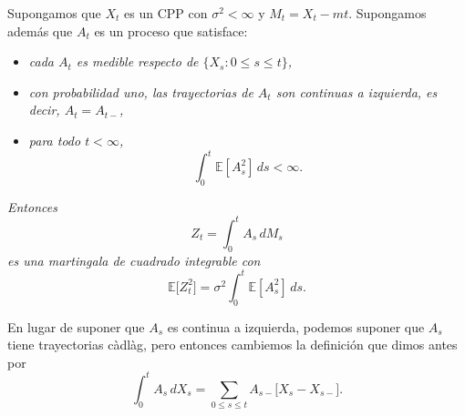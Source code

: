 \documentclass[
marginals=nomargin
]{kaohandt}
\begin{document}
	\begin{proposition}
		Supongamos que $X_t$ es un CPP con $\sigma^2 < \infty$ y $M_t = X_t - mt$. Supongamos además que $A_t$ es un proceso que satisface:
		
		\begin{itemize}
			\item \textit{cada $A_t$ es medible respecto de $\{X_s : 0 \leq s \leq t\}$,}
			\item \textit{con probabilidad uno, las trayectorias de $A_t$ son continuas a izquierda, es decir, $A_t = A_{t-}$,}
			\item \textit{para todo $t < \infty$,}
			\[
			\int_0^t \mathbb{E}[A_s^2]\, ds < \infty.
			\]
		\end{itemize}
		
		\textit{Entonces}
		\[
		Z_t = \int_0^t A_s\, dM_s
		\]
		\textit{es una martingala de cuadrado integrable con}
		\begin{equation}
			\mathbb{E}\big[Z_t^2\big] = \sigma^2 \int_0^t \mathbb{E}[A_s^2]\, ds.
			\label{eq:1}
		\end{equation}
		
		En lugar de suponer que $A_s$ es continua a izquierda, podemos suponer que $A_s$ tiene trayectorias càdlàg, pero entonces cambiemos la definición que dimos antes por
		\[
		\int_0^t A_s\, dX_s = \sum_{0 \leq s \leq t} A_{s-} \big[X_s - X_{s-}\big].
		\]
	\end{proposition}
	
\end{document}
